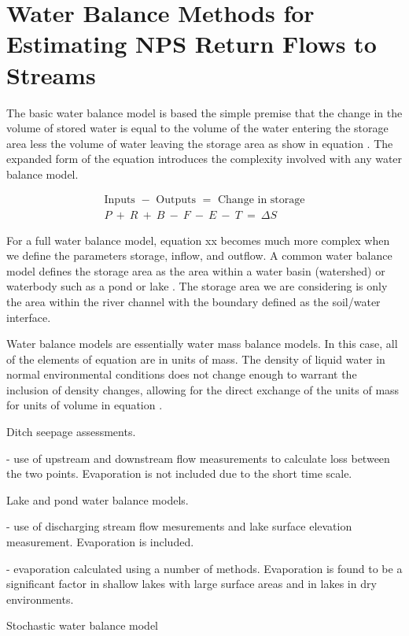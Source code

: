 \section{Water Balance Methods for Estimating NPS Return Flows to Streams}
\label{sec:water balance methods}

The basic water balance model is based the simple premise that the change in the volume of stored water is equal to the volume of the water entering the storage area less the volume of water leaving the storage area as show in equation \todoe .  The expanded form of the equation introduces the complexity involved with any water balance model.

\begin{gather}
\text{Inputs }-\text{ Outputs }=\text{ Change in storage}\nonumber\\
P\:+\:R\:+\:B\:-\:F\:-\:E\:-\:T\:=\:\Delta S
\end{gather}


For a full water balance model, equation xx \todoe becomes much more complex when we define the parameters storage, inflow, and outflow.  A common  water balance model defines the storage area as the area within a water basin (watershed) or waterbody such as a pond or lake \todoc.  The storage area we are considering is only the area within the river channel with the boundary defined as the soil/water interface.

Water balance models are essentially water mass balance models.  In this case, all of the elements of equation \todoe are in units of mass.  The density of liquid water in normal environmental conditions does not change enough to warrant the inclusion of density changes, allowing for the direct exchange of the units of mass for units of volume in equation \todoe .

Ditch seepage assessments.

- use of upstream and downstream flow measurements to calculate loss between the two points.  Evaporation is not included due to the short time scale.


Lake and pond water balance models.

- use of discharging stream flow mesurements and lake surface elevation measurement.  Evaporation is included.

- evaporation calculated using a number of methods.  Evaporation is found to be a significant factor in shallow lakes with large surface areas and in lakes in dry environments.


Stochastic water balance model
\clearpage{}